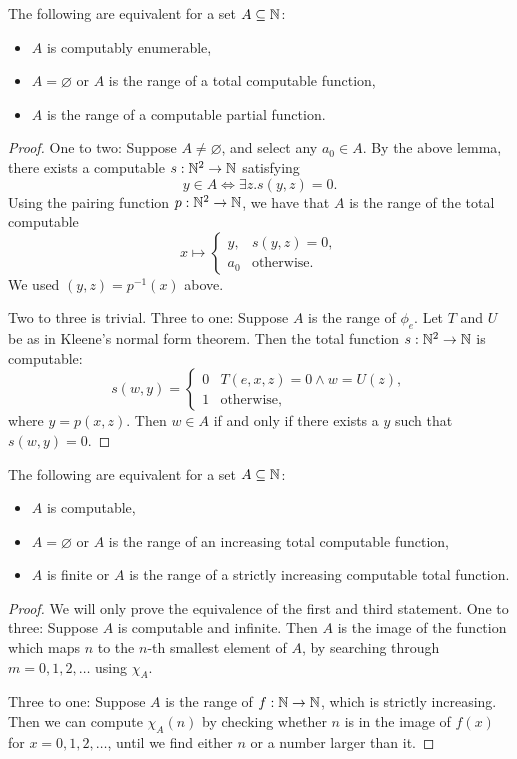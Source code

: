 \begin{theorem}
  The following are equivalent for a set $A \subseteq \mathbb{N}$:
  \begin{itemize}
  \item $A$ is computably enumerable,
  \item $A = \varnothing$ or $A$ is the range of a total computable function,
  \item $A$ is the range of a computable partial function.
  \end{itemize}
\end{theorem}

\begin{proof}
  One to two:
  Suppose $A \ne \varnothing$, and select any $a_0 \in A$.
  By the above lemma, there exists a computable $s: \mathbb{N}^2 \to \mathbb{N}$ satisfying
  \[
	y \in A \iff \exists z. s(y,z) = 0.
  \]
  Using the pairing function $p: \mathbb{N}^2 \to \mathbb{N}$, we have that $A$ is the range of
  the total computable
  \[
	x \mapsto
	\begin{cases}
	  y, & s(y,z) = 0, \\
	  a_0 & \text{otherwise}.
	\end{cases}
  \]
  We used $(y, z) = p^{-1}(x)$ above.

  Two to three is trivial.
  Three to one:
  Suppose $A$ is the range of $\phi_e$.
  Let $T$ and $U$ be as in Kleene's normal form theorem.
  Then the total function $s: \mathbb{N}^2 \to \mathbb{N}$ is computable:
  \[
	s(w,y) =
	\begin{cases}
	  0 & T(e, x, z) = 0  \land w = U(z), \\
	  1 & \text{otherwise},
	\end{cases}
  \]
  where $y = p(x,z)$.
  Then $w \in A$ if and only if there exists a $y$ such that $s(w,y) = 0$.
\end{proof}

\begin{theorem}
  The following are equivalent for a set $A \subseteq \mathbb{N}$:
  \begin{itemize}
  \item $A$ is computable,
  \item $A = \varnothing$ or $A$ is the range of an increasing total computable
	function,
  \item $A$ is finite or $A$ is the range of a strictly increasing computable
	total function.
  \end{itemize}
\end{theorem}

\begin{proof}
  We will only prove the equivalence of the first and third statement.
  One to three:
  Suppose $A$ is computable and infinite.
  Then $A$ is the image of the function which maps $n$ to the $n$-th smallest
  element of $A$, by searching through $m = 0, 1, 2, \ldots$ using $\chi_A$.

  Three to one:
  Suppose $A$ is the range of $f: \mathbb{N} \to \mathbb{N}$, which is strictly increasing.
  Then we can compute $\chi_A(n)$ by checking whether $n$ is in the image
  of $f(x)$ for $x = 0, 1, 2, \ldots$, until we find either $n$ or a number
  larger than it.
\end{proof}

